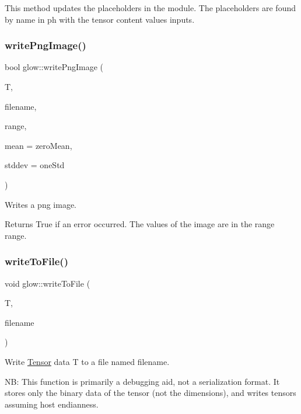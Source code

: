 This method updates the placeholders in the module. The placeholders are found by name in {\ttfamily ph} with the tensor content values {\ttfamily inputs}. \mbox{\label{namespaceglow_acfb0a7a5b75a41f5ba57843e7f242338}} 
\subsubsection{\texorpdfstring{write\+Png\+Image()}{writePngImage()}}
{\footnotesize\ttfamily bool glow\+::write\+Png\+Image (\begin{DoxyParamCaption}\item[{\hyperlink{classglow_1_1_tensor}{Tensor} $\ast$}]{T,  }\item[{const char $\ast$}]{filename,  }\item[{std\+::pair$<$ float, float $>$}]{range,  }\item[{llvm\+::\+Array\+Ref$<$ float $>$}]{mean = {\ttfamily zeroMean},  }\item[{llvm\+::\+Array\+Ref$<$ float $>$}]{stddev = {\ttfamily oneStd} }\end{DoxyParamCaption})}

Writes a png image. \begin{DoxyReturn}{Returns}
True if an error occurred. The values of the image are in the range {\ttfamily range}. 
\end{DoxyReturn}
\mbox{\label{namespaceglow_a5605652aaef5081976134120c3dcd4d5}} 
\subsubsection{\texorpdfstring{write\+To\+File()}{writeToFile()}}
{\footnotesize\ttfamily void glow\+::write\+To\+File (\begin{DoxyParamCaption}\item[{const \hyperlink{classglow_1_1_tensor}{Tensor} \&}]{T,  }\item[{llvm\+::\+String\+Ref}]{filename }\end{DoxyParamCaption})}

Write \hyperlink{classglow_1_1_tensor}{Tensor} data {\ttfamily T} to a file named {\ttfamily filename}.

NB\+: This function is primarily a debugging aid, not a serialization format. It stores only the binary data of the tensor (not the dimensions), and writes tensors assuming host endianness. 

